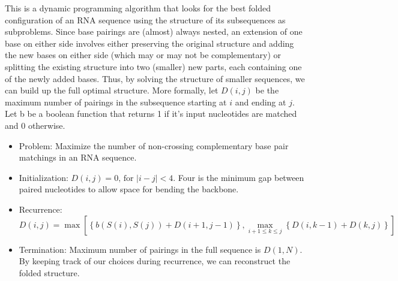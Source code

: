 \documentclass[11pt,a4paper]{article}
\begin{document}
This is a dynamic programming algorithm that looks for the best folded configuration of an RNA sequence using the structure of its subsequences as subproblems. Since base pairings are (almost) always nested, an extension of one base on either side involves either preserving the original structure and adding the new bases on either side (which may or may not be complementary) or splitting the existing structure into two (smaller) new parts, each containing one of the newly added bases. Thus, by solving the structure of smaller sequences, we can build up the full optimal structure. More formally, let $D(i,j)$ be the maximum number of pairings in the subsequence starting at $i$ and ending at $j$. Let b be a boolean function that returns 1 if it's input nucleotides are matched and 0 otherwise.

\begin{itemize}

\item Problem:
Maximize the number of non-crossing complementary base pair matchings in an RNA sequence. 



\iffalse %
\item Constraints:

\begin{enumerate}

\item Only complementary bases can be paired, i.e., A with U and C with G. 
\item The secondary structure consists disjoint pairs and unmatched bases. Each base can pair with at most one base.
\item The pairs in a matching must not cross, i.e., if bases in positions $i$ and $j$ are paired and if bases $k$ and $l$ are paired, then either they are nested, i.e., $i < k < l < j$ or they are non-intersecting, i.e., $i < j < k < l$. 
\item If the bases in positions i and j are paired, then $i < j - 4$.
\end{enumerate}
\fi   %



\item Initialization:
$D(i,j)=0\text{, for }|i-j|<4$. Four is the minimum gap between paired nucleotides to allow space for bending the backbone.

\item Recurrence:
\begin{equation}\label{recurr}
D(i,j)= \max \left[\left\lbrace b(S(i), S(j))+D(i+1,j-1)\right\rbrace, \max\limits_{i+1\leq k\leq j}\left\lbrace D(i, k-1)+ D(k,j)\right\rbrace\right]
\end{equation}

\item Termination:
Maximum number of pairings in the full sequence is $D(1,N)$. By keeping track of our choices during recurrence, we can reconstruct the folded structure.


\end{itemize}
\end{document}
